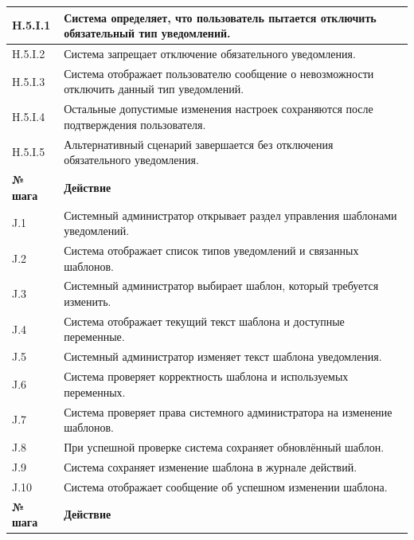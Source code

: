 \documentclass[12pt,a4paper]{article}
\begin{document}
\begin{xltabular}{\textwidth}{
				|>{\raggedright\arraybackslash}p{2.7cm}
				|>{\raggedright\arraybackslash}X|
			}
			H.5.I.1 & Система определяет, что пользователь пытается отключить обязательный
			тип уведомлений. \\
			\hline
			H.5.I.2 & Система запрещает отключение обязательного уведомления. \\
			\hline
			H.5.I.3 & Система отображает пользователю сообщение о невозможности отключить
			данный тип уведомлений. \\
			\hline
			H.5.I.4 & Остальные допустимые изменения настроек сохраняются после
			подтверждения пользователя. \\
			\hline
			H.5.I.5 & Альтернативный сценарий завершается без отключения обязательного
			уведомления. \\
			\hline
			
			
			\textbf{№ шага} & \textbf{Действие} \\
			\hline
			
			J.1 & Системный администратор открывает раздел управления шаблонами
			уведомлений. \\
			\hline
			J.2 & Система отображает список типов уведомлений и связанных шаблонов. \\
			\hline
			J.3 & Системный администратор выбирает шаблон, который требуется изменить. \\
			\hline
			J.4 & Система отображает текущий текст шаблона и доступные переменные. \\
			\hline
			J.5 & Системный администратор изменяет текст шаблона уведомления. \\
			\hline
			J.6 & Система проверяет корректность шаблона и используемых переменных. \\
			\hline
			J.7 & Система проверяет права системного администратора на изменение
			шаблонов. \\
			\hline
			J.8 & При успешной проверке система сохраняет обновлённый шаблон. \\
			\hline
			J.9 & Система сохраняет изменение шаблона в журнале действий. \\
			\hline
			J.10 & Система отображает сообщение об успешном изменении шаблона. \\
			\hline
			
			
			\textbf{№ шага} & \textbf{Действие} \\
			\hline
			

\end{xltabular}
\end{document}
